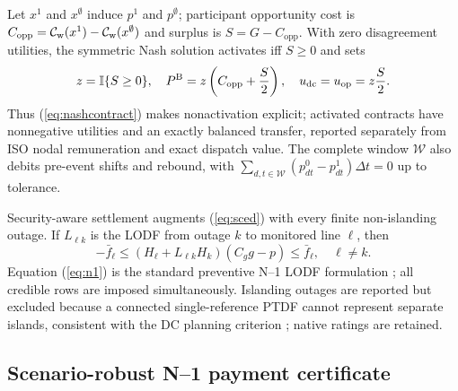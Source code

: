 \documentclass[10pt,journal]{IEEEtran}
\newcommand{\dt}{\Delta t}
\begin{document}
Let $x^1$ and $x^\emptyset$ induce $p^1$ and $p^\emptyset$; participant
opportunity cost is $C_{\mathrm{opp}}=\mathcal C_{\rm w}(x^1)-\mathcal C_{\rm w}(x^\emptyset)$ and surplus is
$S=G-C_{\mathrm{opp}}$. With zero disagreement utilities, the symmetric Nash
solution \cite{nash1950bargaining} activates iff $S\geq0$ and sets
\begin{equation}
 z=\mathbb I\{S\geq0\},\quad
 P^{\rm B}=z\left(C_{\mathrm{opp}}+\frac{S}{2}\right),\quad
 u_{\rm dc}=u_{\rm op}=z\frac{S}{2}.
 \label{eq:nashcontract}
\end{equation}
Thus (\ref{eq:nashcontract}) makes nonactivation explicit; activated contracts
have nonnegative utilities and an exactly balanced transfer, reported separately
from ISO nodal remuneration and exact dispatch value. The complete window
$\mathcal W$ also debits pre-event shifts and rebound, with
$\sum_{d,t\in\mathcal W}(p^0_{dt}-p^1_{dt})\dt=0$ up to tolerance.

Security-aware settlement augments (\ref{eq:sced}) with every finite
non-islanding outage. If $L_{\ell k}$ is the LODF from outage $k$ to monitored
line $\ell$, then
\begin{equation}
 -\bar f_\ell\leq
 (H_\ell+L_{\ell k}H_k)(C_gg-p)\leq\bar f_\ell,
 \quad \ell\neq k.
 \label{eq:n1}
\end{equation}
Equation (\ref{eq:n1}) is the standard preventive N--1 LODF formulation
\cite{tejada2018lodf}; all credible rows are imposed simultaneously. Islanding
outages are reported but excluded because a connected single-reference PTDF
cannot represent separate islands, consistent with the DC planning criterion
\cite{nerc2020tpl}; native ratings are retained.

\subsection{Scenario-robust N--1 payment certificate}
\end{document}
